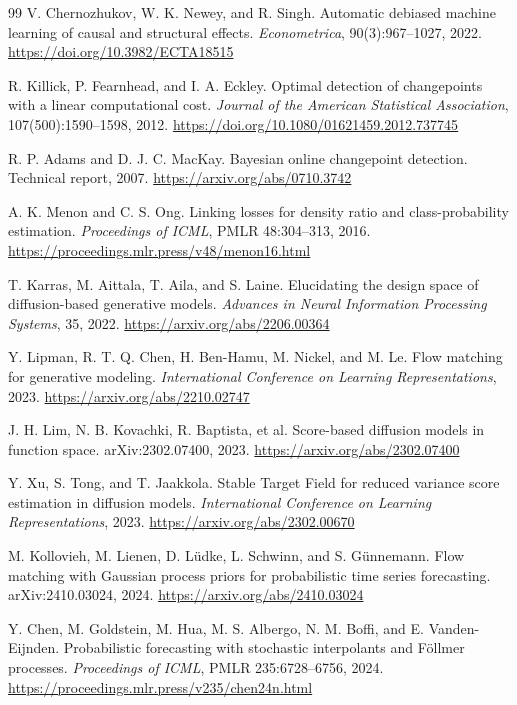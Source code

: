 \documentclass[10pt]{article}
\begin{document}
\begin{thebibliography}{99}
V. Chernozhukov, W. K. Newey, and R. Singh.
Automatic debiased machine learning of causal and structural effects.
\emph{Econometrica}, 90(3):967--1027, 2022.
\url{https://doi.org/10.3982/ECTA18515}

R. Killick, P. Fearnhead, and I. A. Eckley.
Optimal detection of changepoints with a linear computational cost.
\emph{Journal of the American Statistical Association}, 107(500):1590--1598, 2012.
\url{https://doi.org/10.1080/01621459.2012.737745}

R. P. Adams and D. J. C. MacKay.
Bayesian online changepoint detection.
Technical report, 2007.
\url{https://arxiv.org/abs/0710.3742}

A. K. Menon and C. S. Ong.
Linking losses for density ratio and class-probability estimation.
\emph{Proceedings of ICML}, PMLR 48:304--313, 2016.
\url{https://proceedings.mlr.press/v48/menon16.html}

T. Karras, M. Aittala, T. Aila, and S. Laine.
Elucidating the design space of diffusion-based generative models.
\emph{Advances in Neural Information Processing Systems}, 35, 2022.
\url{https://arxiv.org/abs/2206.00364}

Y. Lipman, R. T. Q. Chen, H. Ben-Hamu, M. Nickel, and M. Le.
Flow matching for generative modeling.
\emph{International Conference on Learning Representations}, 2023.
\url{https://arxiv.org/abs/2210.02747}

J. H. Lim, N. B. Kovachki, R. Baptista, et al.
Score-based diffusion models in function space.
arXiv:2302.07400, 2023.
\url{https://arxiv.org/abs/2302.07400}

Y. Xu, S. Tong, and T. Jaakkola.
Stable Target Field for reduced variance score estimation in diffusion models.
\emph{International Conference on Learning Representations}, 2023.
\url{https://arxiv.org/abs/2302.00670}

M. Kollovieh, M. Lienen, D. L\"udke, L. Schwinn, and S. G\"unnemann.
Flow matching with Gaussian process priors for probabilistic time series forecasting.
arXiv:2410.03024, 2024.
\url{https://arxiv.org/abs/2410.03024}

Y. Chen, M. Goldstein, M. Hua, M. S. Albergo, N. M. Boffi, and E. Vanden-Eijnden.
Probabilistic forecasting with stochastic interpolants and F\"ollmer processes.
\emph{Proceedings of ICML}, PMLR 235:6728--6756, 2024.
\url{https://proceedings.mlr.press/v235/chen24n.html}

\end{thebibliography}
\end{document}
